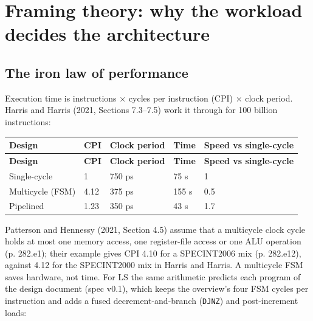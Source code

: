 \section{Framing theory: why the workload decides the architecture}

\subsection{The iron law of performance}

Execution time is instructions × cycles per instruction (CPI) × clock period. Harris and Harris (2021, Sections 7.3–7.5) work it through for 100 billion instructions:

{\footnotesize\setlength{\tabcolsep}{4pt}
\begin{xltabular}{\linewidth}{@{}llllL@{}}
\toprule \textsf{\bfseries Design} & \textsf{\bfseries CPI} & \textsf{\bfseries Clock period} & \textsf{\bfseries Time} & \textsf{\bfseries Speed vs single-cycle} \\ \midrule\endfirsthead
\toprule \textsf{\bfseries Design} & \textsf{\bfseries CPI} & \textsf{\bfseries Clock period} & \textsf{\bfseries Time} & \textsf{\bfseries Speed vs single-cycle} \\ \midrule\endhead
\bottomrule\endlastfoot
Single-cycle & 1 & 750 ps & 75 s & 1 \\*
Multicycle (FSM) & 4.12 & 375 ps & 155 s & 0.5 \\*
Pipelined & 1.23 & 350 ps & 43 s & 1.7 \\
\end{xltabular}}

Patterson and Hennessy (2021, Section 4.5) assume that a multicycle clock cycle holds at most one memory access, one register-file access or one ALU operation (p. 282.e1); their example gives CPI 4.10 for a SPECINT2006 mix (p. 282.e12), against 4.12 for the SPECINT2000 mix in Harris and Harris. A multicycle FSM saves hardware, not time. For LS the same arithmetic predicts each program of the design document (spec v0.1), which keeps the overview's four FSM cycles per instruction and adds a fused decrement-and-branch (\texttt{DJNZ}) and post-increment loads:


